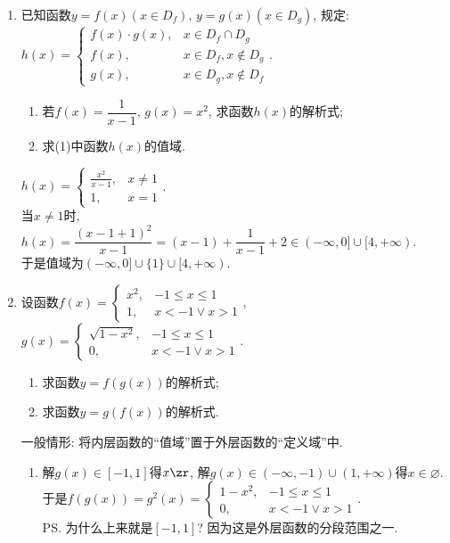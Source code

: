 \begin{enumerate}
\begin{vspace_}
\vsp[3]
\end{vspace_}

\item 已知函数$y=f(x)(x\in D_f)$, $y=g(x)(x\in D_g)$, 规定: \\
$h(x)=\begin{cases}
f(x)\cdot g(x), & x\in D_f\cap D_g\\
f(x), & x\in D_f, x\notin D_g\\
g(x), & x\in D_g, x\notin D_f
\end{cases}$. 
\begin{enumerate}
\item 若$f(x)=\dfrac{1}{x-1}$, $g(x)=x^2$, 求函数$h(x)$的解析式; 
\item 求(1)中函数$h(x)$的值域. 
\end{enumerate}
\begin{jieda}
$h(x)=\begin{cases}
\frac{x^2}{x-1}, & x\neq 1\\
1, & x=1
\end{cases}$. \\
当$x\neq 1$时, $h(x)=\dfrac{(x-1+1)^2}{x-1}=(x-1)+\dfrac{1}{x-1}+2\in(-\infty,0]\cup[4,+\infty)$. \\
于是值域为$(-\infty,0]\cup\{1\}\cup[4,+\infty)$. 
\end{jieda}
\begin{vspace_}
\vsp[3]
\end{vspace_}

\item 设函数$f(x)=\begin{cases}
x^2, & -1\leq x\leq 1\\
1, & x<-1\lor x>1
\end{cases}$, 
$g(x)=\begin{cases}
\sqrt{1-x^2}, & -1\leq x\leq 1\\
0, & x<-1\lor x>1
\end{cases}$. 
\begin{enumerate}
\item 求函数$y=f(g(x))$的解析式; 
\item 求函数$y=g(f(x))$的解析式. 
\end{enumerate}
\begin{jieda}
一般情形: 将内层函数的``值域''置于外层函数的``定义域''中. 
\begin{enumerate}
\item 解$g(x)\in[-1,1]$得$x\zr$, 解$g(x)\in(-\infty,-1)\cup(1,+\infty)$得$x\in\varnothing$. \\
于是$f(g(x))=g^2(x)=\begin{cases}
1-x^2, & -1\leq x\leq 1\\
0, & x<-1\lor x>1
\end{cases}$. \\
\ps 为什么上来就是$[-1,1]$? 因为这是外层函数的分段范围之一. 


\end{enumerate}
\end{jieda}
\end{enumerate}
